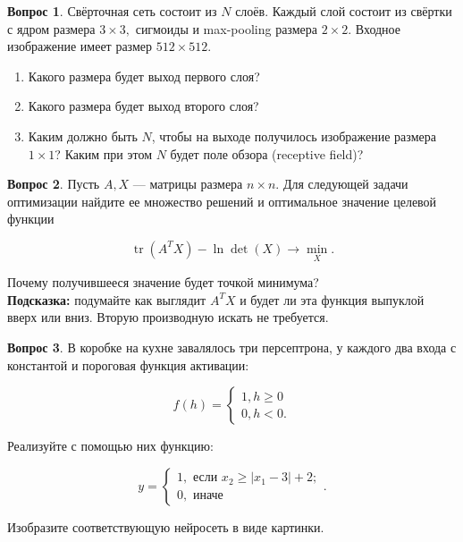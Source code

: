 \documentclass[12pt]{article}
\DeclareMathOperator{\tr}{tr}
\theoremstyle{definition}
\newtheorem{question}{Вопрос}
\begin{document}
\vspace{4cm} 

\begin{question}
Свёрточная сеть состоит из $N$ слоёв. Каждый слой состоит из свёртки с ядром размера $3 \times 3,$ сигмоиды и max-pooling размера $2 \times 2$. Входное изображение имеет размер $512 \times 512.$ 
    \begin{enumerate} 
        \item Какого размера будет выход первого слоя?
        \item Какого размера будет выход второго слоя? 
        \item Каким должно быть $N$, чтобы на выходе получилось изображение размера $1 \times 1$? Каким при этом $N$ будет поле обзора (receptive field)? 
    \end{enumerate} 
\end{question}


\newpage 

\begin{question}
    Пусть $A, X$ --- матрицы размера $n \times n$. Для следующей задачи оптимизации найдите ее множество решений и оптимальное значение целевой функции
    
    \[
    \tr(A^TX) - \ln \det(X) \to \min_X.
    \]
    
    Почему получившееся значение будет точкой минимума? \\
    \textbf{Подсказка:} подумайте как выглядит $A^TX$ и будет ли эта функция выпуклой вверх или вниз. Вторую производную искать не требуется. 

\end{question}


\vspace{5cm} 

\begin{question}
В коробке на кухне завалялось три персептрона, у каждого два входа с константой и пороговая функция активации:

\begin{equation*} 
f(h) = \begin{cases} 1, h \ge 0 \\ 0, h < 0.\end{cases}
\end{equation*} 

Реализуйте с помощью них функцию:

$$
y = \begin{cases}
1, \text{ если } x_2 \geq |x_1 - 3| + 2; \\
0, \text{ иначе}
\end{cases}.
$$

Изобразите соответствующую нейросеть в виде картинки.
\end{question}
\end{document}
